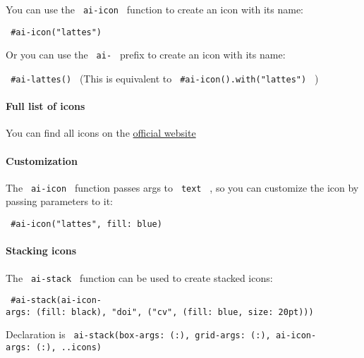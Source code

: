 You can use the \texttt{\ ai-icon\ } function to create an icon with its
name:

\texttt{\ \#ai-icon("lattes")\ }

Or you can use the \texttt{\ ai-\ } prefix to create an icon with its
name:

\texttt{\ \#ai-lattes()\ } (This is equivalent to
\texttt{\ \#ai-icon().with("lattes")\ } )

\paragraph{Full list of icons}\label{full-list-of-icons}

You can find all icons on the
\href{https://jpswalsh.github.io/academicons/}{official website}

\paragraph{Customization}\label{customization}

The \texttt{\ ai-icon\ } function passes args to \texttt{\ text\ } , so
you can customize the icon by passing parameters to it:

\texttt{\ \#ai-icon("lattes",\ fill:\ blue)\ }

\paragraph{Stacking icons}\label{stacking-icons}

The \texttt{\ ai-stack\ } function can be used to create stacked icons:

\texttt{\ \#ai-stack(ai-icon-args:\ (fill:\ black),\ "doi",\ ("cv",\ (fill:\ blue,\ size:\ 20pt)))\ }

Declaration is
\texttt{\ ai-stack(box-args:\ (:),\ grid-args:\ (:),\ ai-icon-args:\ (:),\ ..icons)\ }


